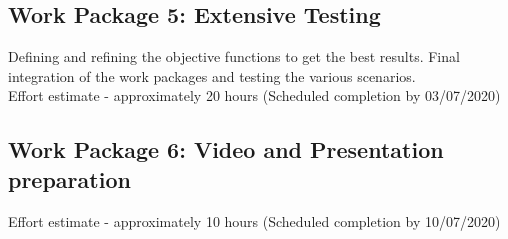 \documentclass[12pt,pdftex,a4paper]{article}
\begin{document}
\subsection*{Work Package 5: Extensive Testing}
Defining and refining the objective functions to get the best results.
Final integration of the work packages and testing the various scenarios. \\
Effort estimate - approximately 20 hours (Scheduled completion by 03/07/2020)

\subsection*{Work Package 6: Video and Presentation preparation}
Effort estimate - approximately 10 hours (Scheduled completion by 10/07/2020)
\end{document}
